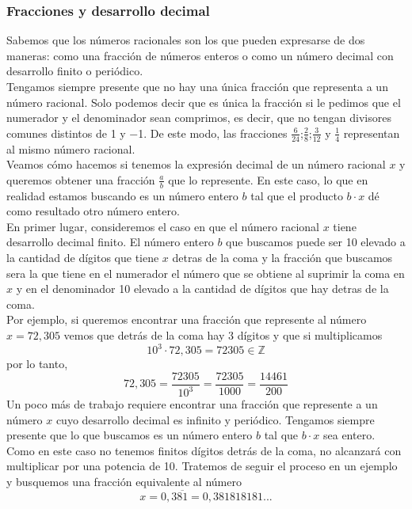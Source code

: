 \documentclass[Análisis.root.tex]{subfiles}
\newcommand{\Z}{\mathbb{Z}}
\begin{document}
        \subsubsection{Fracciones y desarrollo decimal}
        Sabemos que los números racionales son los que pueden expresarse de dos maneras: como una fracción de números enteros o como un número decimal con desarrollo finito o periódico.\\
        Tengamos siempre presente que no hay una única fracción que representa a un número racional. Solo podemos decir que es única la fracción si le pedimos que el numerador y el denominador sean comprimos, es decir, que no tengan divisores comunes distintos de 1 y −1. De este modo, las fracciones \(\frac{6}{24}\);\(\frac{2}{8}\);\(\frac{3}{12}\) y \(\frac{1}{4}\) representan al mismo número racional.\\
        Veamos cómo hacemos si tenemos la expresión decimal de un número racional \(x\) y queremos obtener una fracción \(\frac{a}{b}\) que lo represente. En este caso, lo que en realidad estamos buscando es un número entero \(b\) tal que el producto \(b \cdot x\) dé como resultado otro número entero.\\
        En primer lugar, consideremos el caso en que el número racional \(x\) tiene desarrollo decimal finito. El número entero \(b\) que buscamos puede ser 10 elevado a la cantidad de dígitos que tiene \(x\) detras de la coma y la fracción que buscamos sera la que tiene en el numerador el número que se obtiene al suprimir la coma en \(x\) y en el denominador 10 elevado a la cantidad de dígitos que hay detras de la coma.\\
        Por ejemplo, si queremos encontrar una fracción que represente al número \(x = 72,305\) vemos que detrás de la coma hay 3 dígitos y que si multiplicamos
        \[10^3\cdot72,305=72305\in\Z\] por lo tanto, \[72,305=\frac{72305}{10^3}=\frac{72305}{1000}=\frac{14461}{200}\]
        Un poco más de trabajo requiere encontrar una fracción que represente a un número \(x\) cuyo desarrollo decimal es infinito y periódico. Tengamos siempre presente que lo que buscamos es un número entero \(b\) tal que \(b \cdot x\) sea entero. Como en este caso no tenemos finitos dígitos detrás de la coma, no alcanzará con multiplicar por una potencia de 10. Tratemos de seguir el proceso en un ejemplo y busquemos una fracción equivalente al número \[x=0,3\overline{81}=0,381818181...\]
\end{document}
